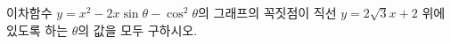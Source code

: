 이차함수 $y=x^2-2x\sin\theta-\cos^2\theta$의 그래프의 꼭짓점이 직선 $y=2\sqrt{3}x+2$ 위에 있도록 하는 $\theta$의 값을 모두 구하시오. \cond{$0\le\theta<2\pi$}
